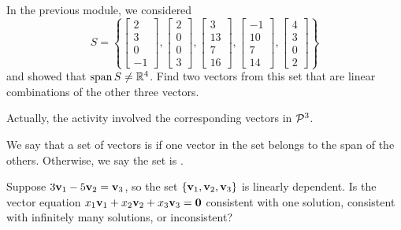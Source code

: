 
\begin{applicationActivities}{1}{12}

\begin{activity}{15}
  In the previous module, we considered
  \[S=\left\{
  \begin{bmatrix}2\\3\\0\\-1\end{bmatrix},
  \begin{bmatrix}2\\0\\0\\3\end{bmatrix},
  \begin{bmatrix}3\\13\\7\\16\end{bmatrix},
  \begin{bmatrix}-1\\10\\7\\14\end{bmatrix},
  \begin{bmatrix}4\\3\\0\\2\end{bmatrix}
  \right\}
  \]
  and showed that \(\vspan S\not=\IR^4\). Find two vectors from this set
  that are linear combinations of the other three vectors.

  \begin{TBLnote}
    Actually, the activity involved the corresponding vectors in \(\P^3\).
  \end{TBLnote}
\end{activity}

\begin{definition}
  We say that a set of vectors is  if one vector
  in the set belongs to the span of the others. Otherwise, we say the set
  is .
\end{definition}

\begin{activity}{10}
  Suppose \(3\vect v_1-5\vect v_2=\vect v_3\), so the set
  \(\{\vect v_1,\vect v_2,\vect v_3\}\) is linearly dependent.
  Is the vector equation \(x_1\vect v_1+x_2\vect v_2+x_3\vect v_3=\vect 0\)
  consistent with one solution, consistent with infinitely many solutions,
  or inconsistent?
\end{activity}


\end{applicationActivities}
